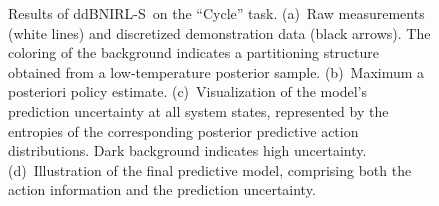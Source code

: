 \documentclass[twoside,11pt]{article}
\newcommand{\ddBNIRLS}{\mbox{ddBNIRL-S}}
\begin{document}
\begin{figure}[h!]
	\hspace{3ex}
	\caption{Results of \ddBNIRLS\  on the ``Cycle'' task. (a)~Raw measurements (white lines) and discretized demonstration data (black arrows). The coloring of the background indicates a partitioning structure obtained from a low-temperature posterior sample. (b)~Maximum a posteriori policy estimate. (c)~Visualization of the model's prediction uncertainty at all system states, represented by the entropies of the corresponding posterior predictive action distributions. %
Dark background indicates high uncertainty. (d)~Illustration of the final predictive model, comprising both the action information and the prediction uncertainty.}
	\label{fig:robot}
\end{figure}
\end{document}
